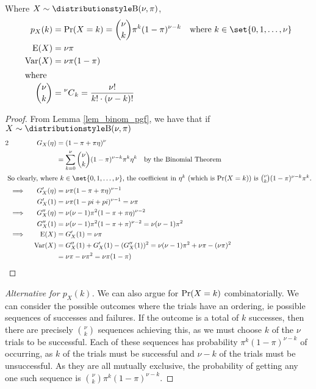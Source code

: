\begin{theorem}
Where \(X \sim \Binomial(\nu, \pi)\),
\begin{align*}
p_X(k) &= \Prob(X = k) = \binom \nu k \pi^k (1 - \pi)^{\nu - k}
    \quad \text{where \(k \in \set{0, 1, \dotsc, \nu}\)} \\
\Expect(X) &= \nu \pi \\
\Var(X) &= \nu \pi (1 - \pi) \\
\intertext{where}
\binom \nu k &= \nCr \nu k = \frac{\nu!}{k!\cdot (\nu - k)!}
\end{align*}
\end{theorem}
\begin{proof}
From Lemma \ref{lem_binom_pgf}, we have that if \(X \sim \Binomial(\nu, \pi)\)
\begin{alignat*} 2
    && G_X(\eta) &= (1 - \pi + \pi \eta)^\nu \\
    &&           &= \sum_{k = 0}^\nu
                    \binom \nu k (1 - \pi)^{\nu - k} \pi^k \eta^k
                        \quad \text{by the Binomial Theorem} \\
    \intertext{
    So clearly, where \(k \in \set{0, 1, \dotsc, \nu}\), the coefficient in
    \(\eta^k\) (which is \(\Prob(X = k)\)) is
    \(\binom \nu k (1 - \pi)^{\nu - k} \pi^k\).}
    &\implies{}& G_X'(\eta) &= \nu \pi (1 - \pi + \pi \eta)^{\nu - 1} \\
    && G_X'(1) &= \nu \pi (1 - pi + pi)^{\nu - 1} = \nu \pi \\
    &\implies{}& G_X''(\eta)
        &= \nu(\nu - 1) \pi^2 (1 - \pi + \pi \eta)^{\nu - 2} \\
    && G_X''(1)
        &= \nu(\nu - 1)\pi^2(1 - \pi + \pi)^{\nu - 2} = \nu(\nu - 1)\pi^2 \\
    &\implies{}& \Expect(X) &= G_X'(1) = \nu \pi \\
    && \Var(X) &= G_X''(1) + G_X'(1) - (G_X''(1))^2
        = \nu(\nu - 1) \pi^2 + \nu \pi - (\nu \pi)^2 \\
    && &= \nu \pi - \nu \pi^2 = \nu \pi (1 - \pi) \qedhere
\end{alignat*}
\end{proof}
\begin{proof}[Alternative for \(p_X(k)\)]
We can also argue for \(\operatorname{Pr}(X = k)\) combinatorially. We can consider the
possible outcomes where the trials have an ordering, ie possible sequences
of successes and failures. If the outcome is a total of \(k\) successes, then
there are precisely \(\binom \nu k\) sequences achieving this, as we must choose
\(k\) of the \(\nu\) trials to be successful. Each of these sequences has
probability \(\pi^k (1 - \pi)^{\nu - k}\) of occurring, as \(k\) of the trials
must be successful and \(\nu - k\) of the trials must be unsuccessful. As they
are all mutually exclusive, the probability of getting any one such sequence is
\(\binom \nu k \pi^k (1 - \pi)^{\nu - k}\).
\end{proof}
